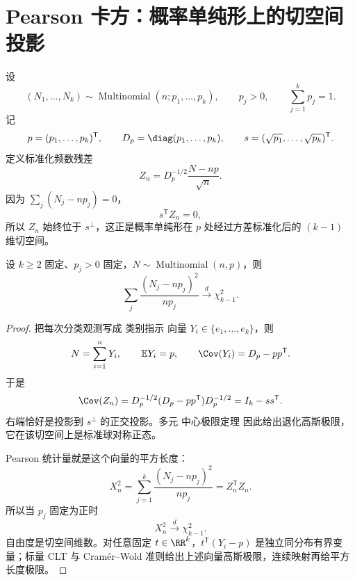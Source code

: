 \section{Pearson 卡方：概率单纯形上的切空间投影}

\begin{definition}[单纯形中的标准化计数波动]
设
\[
 (N_1,\ldots,N_k)
 \sim\operatorname{Multinomial}(n;p_1,\ldots,p_k),
 \qquad
 p_j>0,
 \qquad
 \sum_{j=1}^kp_j=1.
\]
记
\[
 p=(p_1,\ldots,p_k)^{\mathsf T},
 \qquad
 D_p=\diag(p_1,\ldots,p_k),
 \qquad
 s=(\sqrt{p_1},\ldots,\sqrt{p_k})^{\mathsf T}.
\]
定义标准化频数残差
\begin{equation*}Z_n
 =D_p^{-1/2}\frac{N-np}{\sqrt n}.
\end{equation*}
因为 $\sum_j(N_j-np_j)=0$，
\[
 s^{\mathsf T}Z_n=0,
\]
所以 $Z_n$ 始终位于 $s^\perp$，这正是概率单纯形在 $p$ 处经过方差标准化后的 $(k-1)$ 维切空间。
\end{definition}


\begin{theorem}
设 $k\ge2$ 固定、$p_j>0$ 固定，$N\sim\operatorname{Multinomial}(n,p)$，则
\[
 \sum_j\frac{(N_j-np_j)^2}{np_j}\xrightarrow{d}\chi^2_{k-1}.
\]
\end{theorem}
\begin{proof}
把每次分类观测写成 类别指示 向量 $Y_i\in\{e_1,\ldots,e_k\}$，则
\[
 N=\sum_{i=1}^nY_i,
 \qquad
 \mathbb E Y_i=p,
 \qquad
 \Cov(Y_i)=D_p-pp^{\mathsf T}.
\]
于是
\begin{equation*}\Cov(Z_n)
 =D_p^{-1/2}(D_p-pp^{\mathsf T})D_p^{-1/2}
 =I_k-ss^{\mathsf T}.
\end{equation*}
右端恰好是投影到 $s^\perp$ 的正交投影。多元 中心极限定理 因此给出退化高斯极限，它在该切空间上是标准球对称正态。

Pearson 统计量就是这个向量的平方长度：
\begin{equation}\label{eq:math-stat-pearson-quadratic-form}
 X_n^2
 =\sum_{j=1}^k\frac{(N_j-np_j)^2}{np_j}
 =Z_n^{\mathsf T}Z_n.
\end{equation}
所以当 $p_j$ 固定为正时
\begin{equation*}X_n^2\xrightarrow{d}\chi^2_{k-1}.
\end{equation*}
自由度是切空间维数。对任意固定 $t\in\RR^k$，$t^{\mathsf T}(Y_i-p)$ 是独立同分布有界变量；标量 CLT 与 Cramér--Wold 准则给出上述向量高斯极限，连续映射再给平方长度极限。
\end{proof}

